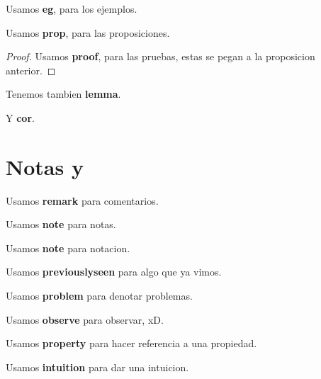 \begin{eg}
  Usamos \textbf{eg}, para los ejemplos.
\end{eg}


\begin{prop}
  Usamos \textbf{prop}, para las proposiciones.
\end{prop}

\begin{proof}
  Usamos \textbf{proof}, para las pruebas, estas se pegan a la proposicion
  anterior.
\end{proof}

\begin{lemma}
	Tenemos tambien \textbf{lemma}.
\end{lemma}

\begin{cor}
	Y \textbf{cor}.
\end{cor}


\section{Notas y }

\begin{remark}
	Usamos \textbf{remark} para comentarios.
\end{remark}

\begin{note}
	Usamos \textbf{note} para notas.
\end{note}

\begin{notation}
	Usamos \textbf{note} para notacion.
\end{notation}


\begin{previouslyseen}
  Usamos \textbf{previouslyseen} para algo que ya vimos.
\end{previouslyseen}

\begin{problem}
  Usamos \textbf{problem} para denotar problemas.
\end{problem}

\begin{observe}
  Usamos \textbf{observe} para observar, xD.
\end{observe}

\begin{property}
  Usamos \textbf{property} para hacer referencia a una propiedad.
\end{property}

\begin{intuition}
  Usamos \textbf{intuition} para dar una intuicion.
\end{intuition}



